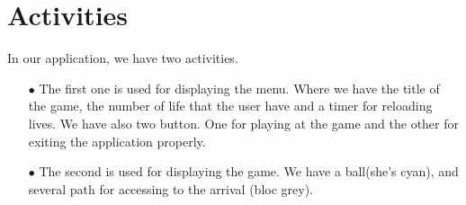 \section{Activities}
In our application, we have two activities.

\begin{itemize}
\item[$\bullet$] The first one is used for displaying the menu. Where we have the title of the game, the number of life that the user have and a timer for reloading lives. We have also two button. One for playing at the game and the other for exiting the application properly.
\item[$\bullet$]  The second  is used for displaying the game. We have a ball(she's cyan), and several path for accessing to the arrival (bloc grey).
\end{itemize}